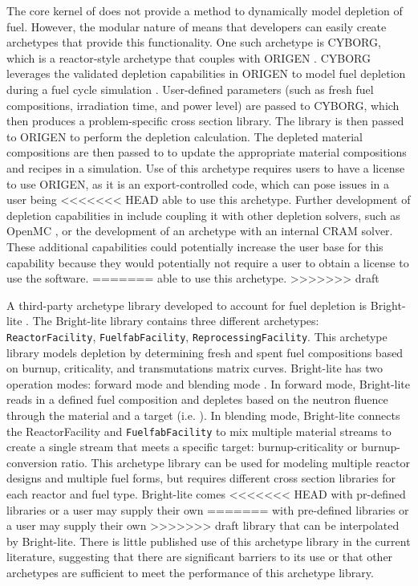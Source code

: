 The core kernel of \Cyclus does not provide a method to dynamically 
model depletion of fuel. However, the modular nature of \Cyclus means 
that developers can easily create archetypes that provide this 
functionality. One such archetype is \gls{CYBORG}, which is a 
reactor-style archetype that couples \Cyclus with ORIGEN 
\cite{skutnik_cyborg_2016}. \gls{CYBORG} leverages the validated 
depletion capabilities in ORIGEN to model fuel depletion during 
a fuel cycle simulation \cite{skutnik_cyborg_2016}. User-defined 
parameters (such as fresh fuel compositions, irradiation time, and 
power level) are passed to \gls{CYBORG}, which then produces a 
problem-specific cross section library. The library is then passed to 
ORIGEN to perform the depletion calculation. The depleted material 
compositions are then passed to \Cyclus to update the appropriate 
material compositions and recipes in a simulation. Use of this 
archetype requires users to have a license to use ORIGEN, as it 
is an export-controlled code, which can pose issues in a user being 
<<<<<<< HEAD
able to use this archetype. Further development of depletion 
capabilities in \Cyclus include coupling it with other 
depletion solvers, such as OpenMC \cite{romano_depletion_2021}, 
or the development of an archetype with an internal CRAM solver. 
These additional capabilities could potentially increase the user base 
for this capability because they would potentially not require a user 
to obtain a license to use the software. 
=======
able to use this archetype. 
>>>>>>> draft

A third-party archetype library developed to account for fuel depletion 
is Bright-lite \cite{schneider_integrated_2016}. The Bright-lite 
library contains three different archetypes: \texttt{ReactorFacility}, 
\texttt{FuelfabFacility}, \texttt{ReprocessingFacility}. This archetype library 
models depletion by determining fresh and spent fuel compositions
based on burnup, criticality, and transmutations matrix curves. 
Bright-lite has two operation modes: forward mode and blending 
mode \cite{schneider_integrated_2016}. In forward mode, Bright-lite 
reads in a defined fuel composition and depletes based on the neutron 
fluence through the material and a target (i.e. ). In 
blending mode, Bright-lite connects the ReactorFacility and 
\texttt{FuelfabFacility} to mix multiple material streams to create a single 
stream that meets a specific target: burnup-criticality or burnup-conversion
ratio. This archetype library can be used for modeling multiple reactor 
designs and multiple fuel forms, but requires different cross 
section libraries for each reactor and fuel type. Bright-lite comes 
<<<<<<< HEAD
with pr-defined libraries or a user may supply their own 
=======
with pre-defined libraries or a user may supply their own 
>>>>>>> draft
library that can be interpolated by Bright-lite. There is little 
published use of this archetype library in the current literature, 
suggesting that there are significant barriers to its use or that 
other archetypes are sufficient to meet the performance of this 
archetype library. 

